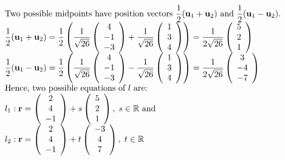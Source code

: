 \documentclass[12pt, a4 paper]{article}
\begin{document}
\begin{outline}[enumerate]
					\[\begin{array}{l}{\textrm{Two possible midpoints have position vectors }}\dfrac{1}{2}({{\bf{u}}_1} + {{\bf{u}}_2}){\textrm{ and }}\dfrac{1}{2}({{\bf{u}}_1} - {{\bf{u}}_2}).\\\dfrac{1}{2}({{\bf{u}}_1} + {{\bf{u}}_2}) = \dfrac{1}{2}\left( {\dfrac{1}{{\sqrt {26} }}\left( {\begin{array}{*{20}{c}}4\\{ - 1}\\{ - 3}\end{array}} \right) + \dfrac{1}{{\sqrt {26} }}\left( {\begin{array}{*{20}{c}}1\\3\\4\end{array}} \right)} \right) = \dfrac{1}{{2\sqrt {26} }}\left( {\begin{array}{*{20}{c}}5\\2\\1\end{array}} \right)\\\dfrac{1}{2}({{\bf{u}}_1} - {{\bf{u}}_2}) = \dfrac{1}{2}\left( {\dfrac{1}{{\sqrt {26} }}\left( {\begin{array}{*{20}{c}}4\\{ - 1}\\{ - 3}\end{array}} \right) - \dfrac{1}{{\sqrt {26} }}\left( {\begin{array}{*{20}{c}}1\\3\\4\end{array}} \right)} \right) = \dfrac{1}{{2\sqrt {26} }}\left( {\begin{array}{*{20}{c}}3\\{ - 4}\\{ - 7}\end{array}} \right)\\{\textrm{Hence, two possible equations of }}l{\textrm{ are:}}\\{l_1}:{\bf{r}} = \left( {\begin{array}{*{20}{c}}2\\4\\{ - 1}\end{array}} \right) + s\left( {\begin{array}{*{20}{c}}5\\2\\1\end{array}} \right),\;s \in \mathbb{R}{\textrm{ and}}\\{l_2}:{\bf{r}} = \left( {\begin{array}{*{20}{c}}2\\4\\{ - 1}\end{array}} \right) + t\left( {\begin{array}{*{20}{c}}{ - 3}\\4\\7\end{array}} \right),\;t \in \mathbb{R}\end{array}\]
																						        

\end{outline}
\end{document}
